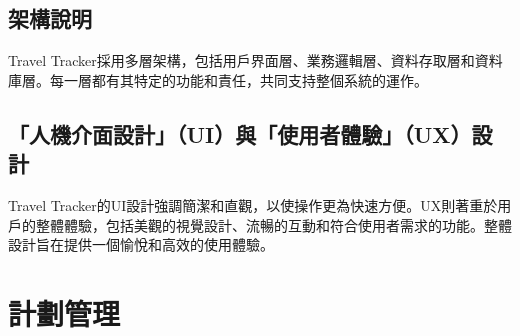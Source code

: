 \documentclass[12pt]{article}
\begin{document}
\subsection{架構說明}

Travel Tracker採用多層架構，包括用戶界面層、業務邏輯層、資料存取層和資料庫層。每一層都有其特定的功能和責任，共同支持整個系統的運作。

\subsection{「人機介面設計」（UI）與「使用者體驗」（UX）設計}


Travel Tracker的UI設計強調簡潔和直觀，以使操作更為快速方便。UX則著重於用戶的整體體驗，包括美觀的視覺設計、流暢的互動和符合使用者需求的功能。整體設計旨在提供一個愉悅和高效的使用體驗。

\section{計劃管理}
\end{document}

